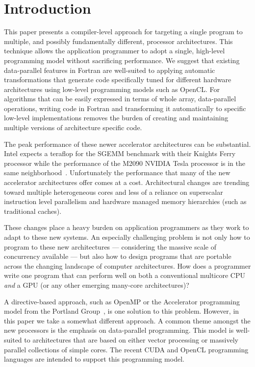 \section{Introduction}
\label{sec:intro}

This paper presents a compiler-level approach for targeting a single program to
multiple, and possibly fundamentally different, processor architectures.  This
technique allows the application programmer to adopt a single, high-level
programming model without sacrificing performance.  We suggest that existing
data-parallel features in Fortran are well-suited to applying automatic
transformations that generate code specifically tuned for different hardware
architectures using low-level programming models such as OpenCL.  For algorithms
that can be easily expressed in terms of whole array, data-parallel operations,
writing code in Fortran and transforming it automatically to specific low-level
implementations removes the burden of creating and maintaining multiple versions
of architecture specific code.

The peak performance of these newer accelerator architectures can be substantial.
Intel expects a teraflop for the SGEMM benchmark with their Knights Ferry
processor while the performance of the M2090 NVIDIA Tesla processor is in the
same neighborhood~\cite{hpcwire11manycore}.  Unfortunately the performance that
many of the new accelerator architectures offer comes at a cost.  Architectural
changes are trending toward multiple heterogeneous cores and less of a reliance
on superscalar instruction level parallelism and hardware managed memory
hierarchies (such as traditional caches).  

These changes place a heavy burden on
application programmers as they work to adapt to these new systems.  An
especially challenging problem is not only how to program to these new
architectures --- considering the massive scale of concurrency available --- but
also how to design programs that are portable across the changing landscape of
computer architectures.  How does a programmer write one program that can
perform well on both a conventional multicore CPU \emph{and} a GPU (or any other emerging many-core architectures)?

A directive-based approach, such as OpenMP or the Accelerator programming model
from the Portland Group~\cite{pgi10accelerator}, is one solution to this
problem.  However, in this paper we take a somewhat different approach.  A
common theme amongst the new processors is the emphasis on data-parallel
programming.  This model is well-suited to architectures that are
based on either vector processing or massively parallel collections of simple
cores.  The recent CUDA and OpenCL programming languages are intended to
support this programming model.

